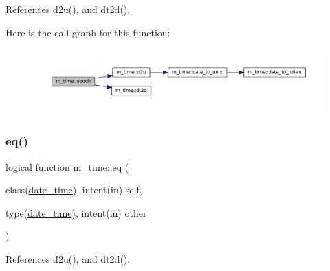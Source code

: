 References d2u(), and dt2d().

Here is the call graph for this function\+:\nopagebreak
\begin{figure}[H]
\begin{center}
\leavevmode
\includegraphics[width=350pt]{namespacem__time_a64abb0c3f90cb0ae1358ef55ce03c175_cgraph}
\end{center}
\end{figure}
\mbox{\label{namespacem__time_a7d365fb381fa8f5f79a4263c9f678b98}} 
\subsubsection{\texorpdfstring{eq()}{eq()}}
{\footnotesize\ttfamily logical function m\+\_\+time\+::eq (\begin{DoxyParamCaption}\item[{class(\mbox{\hyperlink{structm__time_1_1date__time}{date\+\_\+time}}), intent(in)}]{self,  }\item[{type(\mbox{\hyperlink{structm__time_1_1date__time}{date\+\_\+time}}), intent(in)}]{other }\end{DoxyParamCaption})\hspace{0.3cm}{\ttfamily [private]}}



References d2u(), and dt2d().

